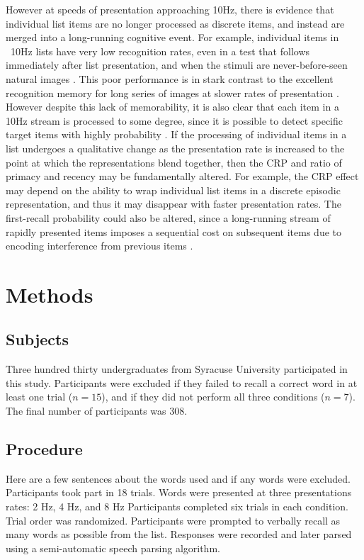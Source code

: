\documentclass[10pt,letterpaper]{article}
\begin{document}
However at speeds of presentation approaching 10Hz, there is evidence that individual list items are no longer processed as discrete items, and instead are merged into a long-running cognitive event.  For example, individual items in ~10Hz lists have very low recognition rates, even in a test that follows immediately after list presentation, and when the stimuli are never-before-seen natural images \cite{PottLevy69}.  This poor performance is in stark contrast to the excellent recognition memory for long series of images  at slower rates of presentation \cite{Stan73}.  However despite this lack of memorability, it is also clear that each item in a 10Hz stream is processed to some degree, since it is possible to detect specific target items with highly probability \cite{Pott76}.
If the processing of individual items in a list undergoes a qualitative change as the presentation rate is increased to the point at which the representations blend together, then the CRP and ratio of primacy and recency may be fundamentally altered. For example, the CRP effect may depend on the ability to wrap individual list items in a discrete episodic representation, and thus it may disappear with faster presentation rates. The first-recall probability could also be altered, since a long-running stream of rapidly presented items imposes a sequential cost on subsequent items due to encoding interference from previous items \cite{WyblEtal09}.  


\section{Methods}

\subsection{Subjects}

Three hundred thirty undergraduates from Syracuse University participated in this study.  
Participants were excluded if they failed to recall a correct word in at least one trial ($n = 15$), and if they did not perform all three conditions ($n = 7$). The final number of participants was 308.

\subsection{Procedure}

Here are a few sentences about the words used and if any words were excluded. Participants took part in 18 trials. Words were presented at three presentations rates: 2 Hz, 4 Hz, and 8 Hz 
Participants completed six trials in each condition. Trial order was randomized.
Participants were prompted to verbally recall as many words as possible from the list. Responses were recorded and later parsed using a semi-automatic speech parsing algorithm.
\end{document}
